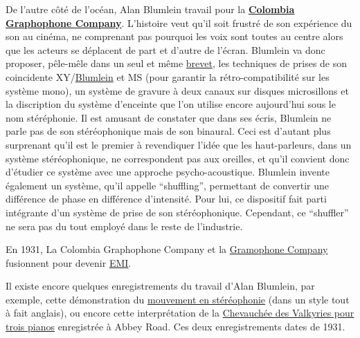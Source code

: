 \documentclass[
  letterpaper,
  DIV=11,
  numbers=noendperiod]{scrreprt}
\begin{document}
De l'autre côté de l'océan, Alan Blumlein travail pour la
\textbf{\href{https://en.wikipedia.org/wiki/Columbia_Graphophone_Company}{Colombia
Graphophone Company}}. L'histoire veut qu'il soit frustré de son
expérience du son au cinéma, ne comprenant pas pourquoi les voix sont
toutes au centre alors que les acteurs se déplacent de part et d'autre
de l'écran. Blumlein va donc proposer, pêle-mêle dans un seul et même
\href{https://en.wikipedia.org/wiki/United_Kingdom_patent_394325}{brevet},
les techniques de prises de son coincidente
XY/\href{https://en.wikipedia.org/wiki/Blumlein_pair}{Blumlein} et MS
(pour garantir la rétro-compatibilité sur les système mono), un système
de gravure à deux canaux sur disques microsillons et la discription du
système d'enceinte que l'on utilise encore aujourd'hui sous le nom
stéréphonie. Il est amusant de constater que dans ses écris, Blumlein ne
parle pas de son stéréophonique mais de son binaural. Ceci est d'autant
plus surprenant qu'il est le premier à revendiquer l'idée que les
haut-parleurs, dans un système stéréophonique, ne correspondent pas aux
oreilles, et qu'il convient donc d'étudier ce système avec une approche
psycho-acoustique. Blumlein invente également un système, qu'il appelle
``shuffling'', permettant de convertir une différence de phase en
différence d'intensité. Pour lui, ce dispositif fait parti intégrante
d'un système de prise de son stéréophonique. Cependant, ce ``shuffler''
ne sera pas du tout employé dans le reste de l'industrie.

\begin{tcolorbox}[enhanced jigsaw, leftrule=.75mm, arc=.35mm, bottomtitle=1mm, colback=white, colbacktitle=quarto-callout-note-color!10!white, opacityback=0, left=2mm, rightrule=.15mm, opacitybacktitle=0.6, breakable, toptitle=1mm, titlerule=0mm, bottomrule=.15mm, toprule=.15mm, coltitle=black, title=\textcolor{quarto-callout-note-color}{\faInfo}\hspace{0.5em}{Note}]

En 1931, La Colombia Graphophone Company et la
\href{https://en.wikipedia.org/wiki/Gramophone_Company}{Gramophone
Company} fusionnent pour devenir
\href{https://en.wikipedia.org/wiki/EMI}{EMI}.

\end{tcolorbox}

Il existe encore quelques enregistrements du travail d'Alan Blumlein,
par exemple, cette démonstration du
\href{https://www.youtube.com/watch?v=rqaMiDqE6QQ}{mouvement en
stéréophonie} (dans un style tout à fait anglais), ou encore cette
interprétation de la
\href{https://www.youtube.com/watch?v=gfWuIEgGUJk}{Chevauchée des
Valkyries pour trois pianos} enregistrée à Abbey Road. Ces deux
enregistrements dates de 1931.
\end{document}
